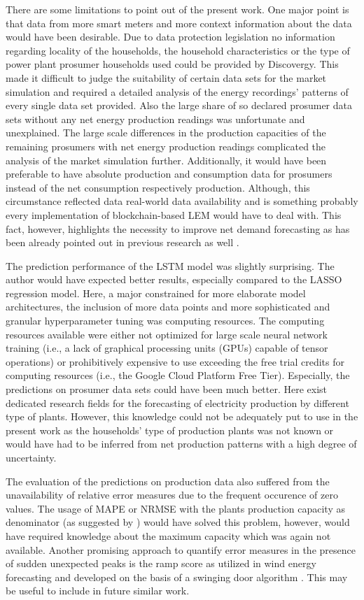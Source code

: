 There are some limitations to point out of the present work. One major point is that data from more smart meters and more context information about the data would have been desirable. Due to data protection legislation no information regarding locality of the households, the household characteristics or the type of power plant prosumer households used could be provided by Discovergy. This made it difficult to judge the suitability of certain data sets for the market simulation and required a detailed analysis of the energy recordings' patterns of every single data set provided. Also the large share of so declared prosumer data sets without any net energy production readings was unfortunate and unexplained. The large scale differences in the production capacities of the remaining prosumers with net energy production readings complicated the analysis of the market simulation further. Additionally, it would have been preferable to have absolute production and consumption data for prosumers instead of the net consumption respectively production. Although, this circumstance reflected data real-world data availability and is something probably every implementation of blockchain-based LEM would have to deal with. This fact, however, highlights the necessity to improve net demand forecasting as has been already pointed out in previous research as well \citep[e.g.,][]{Meer:2018, Hong:2016}.

The prediction performance of the LSTM model was slightly surprising. The author would have expected better results, especially compared to the LASSO regression model. Here, a major constrained for more elaborate model architectures, the inclusion of more data points and more sophisticated and granular hyperparameter tuning was computing resources. The computing resources available were either not optimized for large scale neural network training (i.e., a lack of graphical processing units (GPUs) capable of tensor operations) or prohibitively expensive to use exceeding the free trial credits for computing resources (i.e., the Google Cloud Platform Free Tier). Especially, the predictions on prosumer data sets could have been much better. Here exist dedicated research fields for the forecasting of electricity production by different type of plants. However, this knowledge could not be adequately put to use in the present work as the households' type of production plants was not known or would have had to be inferred from net production patterns with a high degree of uncertainty.

The evaluation of the predictions on production data also suffered from the unavailability of relative error measures due to the frequent occurence of zero values. The usage of MAPE or NRMSE with the plants production capacity as denominator (as suggested by \citet{Hoff:2013}) would have solved this problem, however, would have required knowledge about the maximum capacity which was again not available. Another promising approach to quantify error measures in the presence of sudden unexpected peaks is the ramp score as utilized in wind energy forecasting and developed on the basis of a swinging door algorithm \citep[e.g.,][]{Bianco:2016, Florita:2013}. This may be useful to include in future similar work.

